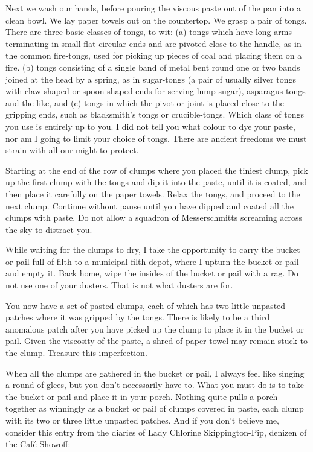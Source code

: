 Next we wash our hands, before pouring the viscous paste out of the pan into a clean bowl. We lay paper towels out on the countertop. We grasp a pair of tongs. There are three basic classes of tongs, to wit: (a) tongs which have long arms terminating in small flat circular ends and are pivoted close to the handle, as in the common fire-tongs, used for picking up pieces of coal and placing them on a fire. (b) tongs consisting of a single band of metal bent round one or two bands joined at the head by a spring, as in sugar-tongs (a pair of usually silver tongs with claw-shaped or spoon-shaped ends for serving lump sugar), asparagus-tongs and the like, and (c) tongs in which the pivot or joint is placed close to the gripping ends, such as blacksmith's tongs or crucible-tongs. Which class of tongs you use is entirely up to you. I did not tell you what colour to dye your paste, nor am I going to limit your choice of tongs. There are ancient freedoms we must strain with all our might to protect.

Starting at the end of the row of clumps where you placed the tiniest clump, pick up the first clump with the tongs and dip it into the paste, until it is coated, and then place it carefully on the paper towels. Relax the tongs, and proceed to the next clump. Continue without pause until you have dipped and coated all the clumps with paste. Do not allow a squadron of Messerschmitts screaming across the sky to distract you.

While waiting for the clumps to dry, I take the opportunity to carry the bucket or pail full of filth to a municipal filth depot, where I upturn the bucket or pail and empty it. Back home, wipe the insides of the bucket or pail with a rag. Do not use one of your dusters. That is not what dusters are for.

You now have a set of pasted clumps, each of which has two little unpasted patches where it was gripped by the tongs. There is likely to be a third anomalous patch after you have picked up the clump to place it in the bucket or pail. Given the viscosity of the paste, a shred of paper towel may remain stuck to the clump. Treasure this imperfection.

When all the clumps are gathered in the bucket or pail, I always feel like singing a round of glees, but you don't necessarily have to. What you must do is to take the bucket or pail and place it in your porch. Nothing quite pulls a porch together as winningly as a bucket or pail of clumps covered in paste, each clump with its two or three little unpasted patches. And if you don't believe me, consider this entry from the diaries of Lady Chlorine Skippington-Pip, denizen of the Caf\'{e} Showoff:

